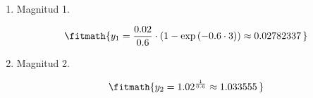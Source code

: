 \begin{enumerate}

\item Magnitud 1.

\[\fitmath{y_{1}=\frac{0.02}{0.6}\cdot \left(1-\exp\left(-0.6\cdot 3\right)\right)\approx 0.02782337\,}\]

\item Magnitud 2.

\[\fitmath{y_{2}={1.02}^{\frac{1}{0.6}}\approx 1.033555\,}\]

\end{enumerate}
